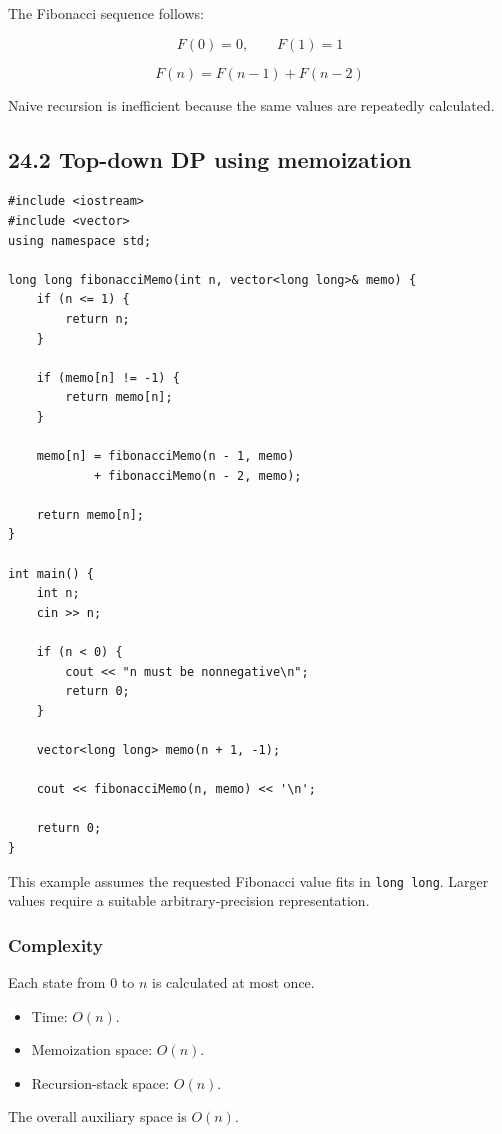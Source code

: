 The Fibonacci sequence follows:


\[
F(0)=0,\qquad F(1)=1
\]



\[
F(n)=F(n-1)+F(n-2)
\]


Naive recursion is inefficient because the same values are repeatedly calculated.

\subsection{24.2 Top-down DP using memoization}

\begin{lstlisting}[style=cppstyle]
#include <iostream>
#include <vector>
using namespace std;

long long fibonacciMemo(int n, vector<long long>& memo) {
    if (n <= 1) {
        return n;
    }

    if (memo[n] != -1) {
        return memo[n];
    }

    memo[n] = fibonacciMemo(n - 1, memo)
            + fibonacciMemo(n - 2, memo);

    return memo[n];
}

int main() {
    int n;
    cin >> n;

    if (n < 0) {
        cout << "n must be nonnegative\n";
        return 0;
    }

    vector<long long> memo(n + 1, -1);

    cout << fibonacciMemo(n, memo) << '\n';

    return 0;
}
\end{lstlisting}

This example assumes the requested Fibonacci value fits in \texttt{long long}. Larger values require a suitable arbitrary-precision representation.

\subsubsection{Complexity}

Each state from $0$ to $n$ is calculated at most once.

\begin{itemize}
    \item Time: $O(n)$.
    \item Memoization space: $O(n)$.
    \item Recursion-stack space: $O(n)$.
\end{itemize}

The overall auxiliary space is $O(n)$.

